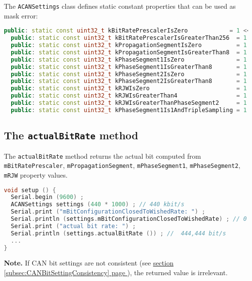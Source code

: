 \documentclass[10pt, a4paper, obeyspaces, openany]{extarticle}
\newcommand \subsectionLabel[2]{\subsection{#1}\label{subsec:#2}}
\newcommand\refSubsectionPage[1]{\hyperref[subsec:#1]{section \ref*{subsec:#1} page \pageref{subsec:#1}}}
\begin{document}
The \texttt{ACANSettings} class defines static constant properties that can be used as mask error:
{ \small\begin{lstlisting}[language=c++]
  public: static const uint32_t kBitRatePrescalerIsZero            = 1 <<  0 ;
  public: static const uint32_t kBitRatePrescalerIsGreaterThan256  = 1 <<  1 ;
  public: static const uint32_t kPropagationSegmentIsZero          = 1 <<  2 ;
  public: static const uint32_t kPropagationSegmentIsGreaterThan8  = 1 <<  3 ;
  public: static const uint32_t kPhaseSegment1IsZero               = 1 <<  4 ;
  public: static const uint32_t kPhaseSegment1IsGreaterThan8       = 1 <<  5 ;
  public: static const uint32_t kPhaseSegment2IsZero               = 1 <<  6 ;
  public: static const uint32_t kPhaseSegment2IsGreaterThan8       = 1 <<  7 ;
  public: static const uint32_t kRJWIsZero                         = 1 <<  8 ;
  public: static const uint32_t kRJWIsGreaterThan4                 = 1 <<  9 ;
  public: static const uint32_t kRJWIsGreaterThanPhaseSegment2     = 1 << 10 ;
  public: static const uint32_t kPhaseSegment1Is1AndTripleSampling = 1 << 11 ;
\end{lstlisting}}









\subsectionLabel{The \texttt{actualBitRate} method}{actualBitRate}


The \texttt{actualBitRate} method returns the actual bit computed from \texttt{mBitRatePrescaler}, \texttt{mPropagationSegment}, \texttt{mPhaseSegment1}, \texttt{mPhaseSegment2}, \texttt{mRJW} property values.

{ \small\begin{lstlisting}[language=c++]
void setup () {
  Serial.begin (9600) ;
  ACANSettings settings (440 * 1000) ; // 440 kbit/s 
  Serial.print ("mBitConfigurationClosedToWishedRate: ") ;
  Serial.println (settings.mBitConfigurationClosedToWishedRate) ; // 0 (--> is false)
  Serial.print ("actual bit rate: ") ;
  Serial.println (settings.actualBitRate ()) ; //  444,444 bit/s
  ...
}
\end{lstlisting}}

{\bf Note. } If CAN bit settings are not consistent (see \refSubsectionPage{CANBitSettingConsistency}), the returned value is irrelevant.
\end{document}
